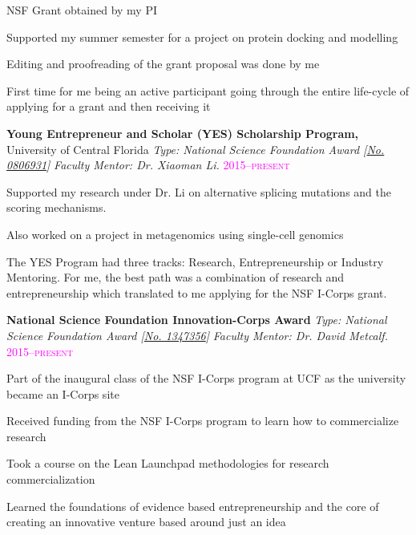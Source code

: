 \documentclass[12pt,letterpaper]{article}
\newenvironment{itemize*}%
{\begin{itemize}%
  \setlength{\itemsep}{0pt}}%
{\end{itemize}}
\newcommand{\rdate}[1]{{\addfontfeature{Numbers=OldStyle} \hfill #1}}
\begin{document}
\begin{itemize*} 
  \item NSF Grant obtained by my PI 
  \item Supported my summer semester for a project on protein docking and modelling
  \item Editing and proofreading of the grant proposal was done by me
  \item First time for me being an active participant going through the entire life-cycle of applying for a grant and then receiving it
\end{itemize*}

\smallskip
\smallskip

\textbf{Young Entrepreneur and Scholar (YES) Scholarship Program,} University of Central Florida \newline
\emph{Type: National Science Foundation Award [\href{http://www.nsf.gov/awardsearch/showAward?AWD_ID=0806931}{No. 0806931}]} \newline
\emph{Faculty Mentor: Dr. Xiaoman Li.} \rdate{\textcolor{magenta}{\textsc{2015}–\textsc{present}}}

\begin{itemize*} 
  \item Supported my research under Dr. Li on alternative splicing mutations and the scoring mechanisms.  
  \item Also worked on a project in metagenomics using single-cell genomics
  \item The YES Program had three tracks: Research, Entrepreneurship or Industry Mentoring. For me, the best path was a combination of research and entrepreneurship which translated to me applying for the NSF I-Corps grant.
\end{itemize*}

\smallskip
\smallskip

\textbf{National Science Foundation Innovation-Corps Award} \newline
\emph{Type: National Science Foundation Award [\href{http://www.nsf.gov/awardsearch/showAward?AWD_ID=1347356}{No. 1347356}]} \newline
\emph{Faculty Mentor: Dr. David Metcalf.} \rdate{\textcolor{magenta}{\textsc{2015}–\textsc{present}}}

\begin{itemize*} 
  \item Part of the inaugural class of the NSF I-Corps program at UCF as the university became an I-Corps site
  \item Received funding from the NSF I-Corps program to learn how to commercialize research 
  \item Took a course on the Lean Launchpad methodologies for research commercialization
  \item Learned the foundations of evidence based entrepreneurship and the core of creating an innovative venture based around just an idea
\end{itemize*}
\end{document}
